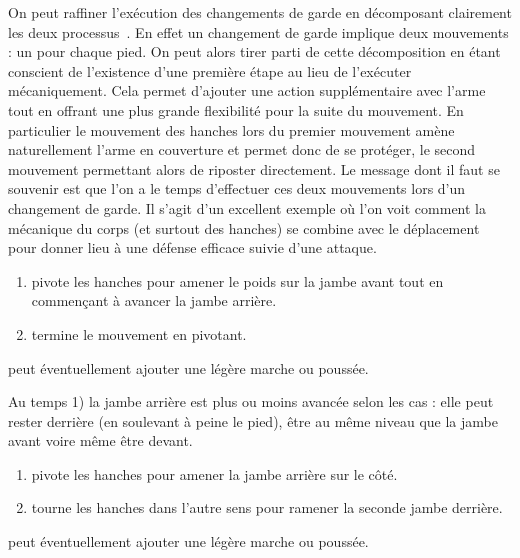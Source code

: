 \label{def:texte:garde-kung-fu}
On peut raffiner l'exécution des changements de garde en décomposant clairement les deux processus~\footnotemark{}.
En effet un changement de garde implique deux mouvements : un pour chaque pied.
On peut alors tirer parti de cette décomposition en étant conscient de l'existence d'une première étape au lieu de l'exécuter mécaniquement.
Cela permet d'ajouter une action supplémentaire avec l'arme tout en offrant une plus grande flexibilité pour la suite du mouvement.
En particulier le mouvement des hanches lors du premier mouvement amène naturellement l'arme en couverture et permet donc de se protéger, le second mouvement permettant alors de riposter directement.
Le message dont il faut se souvenir est que l'on a le temps d'effectuer ces deux mouvements lors d'un changement de garde.
Il s'agit d'un excellent exemple où l'on voit comment la mécanique du corps (et surtout des hanches) se combine avec le déplacement pour donner lieu à une défense efficace suivie d'une attaque.

\begin{technique}
	\label{att:tech:changement-garde-2-temps-avant}

	\begin{enumerate}
		\item \A pivote les hanches pour amener le poids sur la jambe avant tout en commençant à avancer la jambe arrière.
		
		\item \A termine le mouvement en pivotant.
	\end{enumerate}

	\A peut éventuellement ajouter une légère marche ou poussée.

	Au temps 1) la jambe arrière est plus ou moins avancée selon les cas : elle peut rester derrière (en soulevant à peine le pied), être au même niveau que la jambe avant voire même être devant.
\end{technique}


\begin{technique}
	\label{att:tech:changement-garde-2-temps-latéral}

	\begin{enumerate}
		\item \A pivote les hanches pour amener la jambe arrière sur le côté.
		
		\item \A tourne les hanches dans l'autre sens pour ramener la seconde jambe derrière.
	\end{enumerate}

	\A peut éventuellement ajouter une légère marche ou poussée.
\end{technique}


